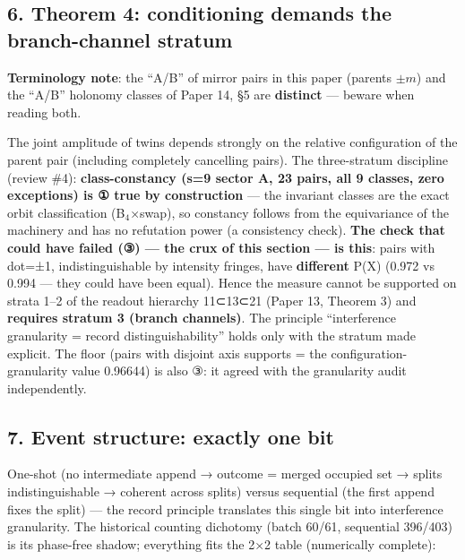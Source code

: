 \documentclass[
]{ltjsarticle}
\begin{document}
\subsection{6. Theorem 4: conditioning demands the branch-channel
stratum}\label{theorem-4-conditioning-demands-the-branch-channel-stratum}

\textbf{Terminology note}: the ``A/B'' of mirror pairs in this paper
(parents \(\pm m\)) and the ``A/B'' holonomy classes of Paper 14, §5 are
\textbf{distinct} --- beware when reading both.

The joint amplitude of twins depends strongly on the relative
configuration of the parent pair (including completely cancelling
pairs). The three-stratum discipline (review \#4):
\textbf{class-constancy (s=9 sector A, 23 pairs, all 9 classes, zero
exceptions) is ① true by construction} --- the invariant classes are the
exact orbit classification (B\(_{4}\)×swap), so constancy follows from
the equivariance of the machinery and has no refutation power (a
consistency check). \textbf{The check that could have failed (③) --- the
crux of this section --- is this}: pairs with dot=±1, indistinguishable
by intensity fringes, have \textbf{different} P(X) (0.972 vs 0.994 ---
they could have been equal). Hence the measure cannot be supported on
strata 1--2 of the readout hierarchy 11⊂13⊂21 (Paper 13, Theorem 3) and
\textbf{requires stratum 3 (branch channels)}. The principle
``interference granularity = record distinguishability'' holds only with
the stratum made explicit. The floor (pairs with disjoint axis supports
= the configuration-granularity value 0.96644) is also ③: it agreed with
the granularity audit independently.

\subsection{7. Event structure: exactly one
bit}\label{event-structure-exactly-one-bit}

One-shot (no intermediate append → outcome = merged occupied set →
splits indistinguishable → coherent across splits) versus sequential
(the first append fixes the split) --- the record principle translates
this single bit into interference granularity. The historical counting
dichotomy (batch 60/61, sequential 396/403) is its phase-free shadow;
everything fits the 2×2 table (numerically complete):
\end{document}
